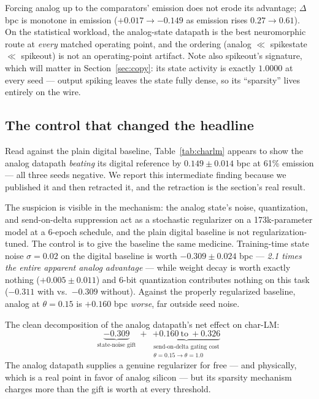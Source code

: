 Forcing analog up to the comparators' emission does not erode its advantage; $\Delta$bpc is
monotone in emission ($+0.017 \rightarrow -0.149$ as emission rises $0.27 \rightarrow 0.61$).
On the statistical workload, the analog-state datapath is the best neuromorphic route at
\emph{every} matched operating point, and the ordering
(analog $\ll$ spikestate $\ll$ spikeout) is not an operating-point artifact. Note also
spikeout's signature, which will matter in Section~\ref{sec:copy}: its state activity is
exactly $1.0000$ at every seed --- output spiking leaves the state fully dense, so its
``sparsity'' lives entirely on the wire.

\subsection{The control that changed the headline}
\label{sec:charlm-control}

Read against the plain digital baseline, Table~\ref{tab:charlm} appears to show the analog
datapath \emph{beating} its digital reference by $0.149 \pm 0.014$ bpc at 61\% emission ---
all three seeds negative. We report this intermediate finding because we published it and then
retracted it, and the retraction is the section's real result.

The suspicion is visible in the mechanism: the analog state's noise, quantization, and
send-on-delta suppression act as a stochastic regularizer on a 173k-parameter model at a
6-epoch schedule, and the plain digital baseline is not regularization-tuned. The control is
to give the baseline the same medicine. Training-time state noise $\sigma{=}0.02$ on the
digital baseline is worth $-0.309 \pm 0.024$ bpc --- \emph{2.1 times the entire apparent analog
advantage} --- while weight decay is worth exactly nothing ($+0.005 \pm 0.011$) and 6-bit
quantization contributes nothing on this task ($-0.311$ with vs.\ $-0.309$ without). Against
the properly regularized baseline, analog at $\theta{=}0.15$ is $+0.160$ bpc \emph{worse}, far
outside seed noise.

The clean decomposition of the analog datapath's net effect on char-LM:
\[
  \underbrace{-0.309}_{\text{state-noise gift}}
  \;+\;
  \underbrace{+0.160 \ \text{to} \ +0.326}_{\substack{\text{send-on-delta gating cost}\\ \theta{=}0.15 \to \theta{=}1.0}}
\]
The analog datapath supplies a genuine regularizer for free --- and physically, which is a real
point in favor of analog silicon --- but its sparsity mechanism charges more than the gift is
worth at every threshold.

